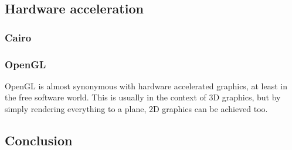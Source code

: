 \documentclass[12pt]{article}
\begin{document}
  \subsection{Hardware acceleration}
   \subsubsection{Cairo}
   \subsubsection{OpenGL}
    OpenGL is almost synonymous with hardware accelerated graphics, at least in the free software world. This is usually in the context of 3D graphics, but by simply rendering everything to a plane, 2D graphics can be achieved too.
  \subsection{Conclusion}
\end{document}
